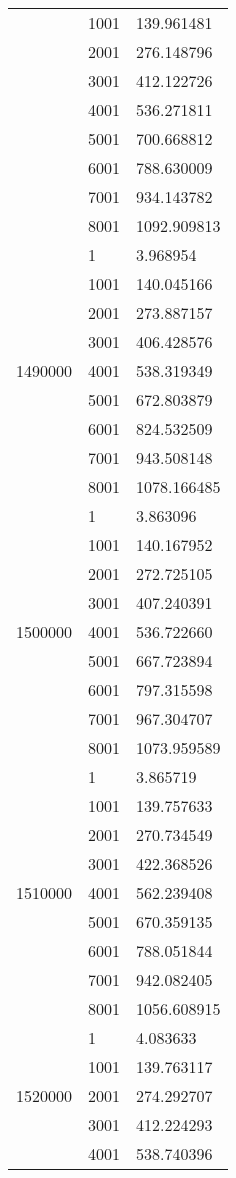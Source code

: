 \begin{table}[htb!]
\begin{tabular}{lll}
 & 1001 & 139.961481 \\
 & 2001 & 276.148796 \\
 & 3001 & 412.122726 \\
 & 4001 & 536.271811 \\
 & 5001 & 700.668812 \\
 & 6001 & 788.630009 \\
 & 7001 & 934.143782 \\
 & 8001 & 1092.909813 \\
\multirow[c]{9}{*}{1490000} & 1 & 3.968954 \\
 & 1001 & 140.045166 \\
 & 2001 & 273.887157 \\
 & 3001 & 406.428576 \\
 & 4001 & 538.319349 \\
 & 5001 & 672.803879 \\
 & 6001 & 824.532509 \\
 & 7001 & 943.508148 \\
 & 8001 & 1078.166485 \\
\multirow[c]{9}{*}{1500000} & 1 & 3.863096 \\
 & 1001 & 140.167952 \\
 & 2001 & 272.725105 \\
 & 3001 & 407.240391 \\
 & 4001 & 536.722660 \\
 & 5001 & 667.723894 \\
 & 6001 & 797.315598 \\
 & 7001 & 967.304707 \\
 & 8001 & 1073.959589 \\
\multirow[c]{9}{*}{1510000} & 1 & 3.865719 \\
 & 1001 & 139.757633 \\
 & 2001 & 270.734549 \\
 & 3001 & 422.368526 \\
 & 4001 & 562.239408 \\
 & 5001 & 670.359135 \\
 & 6001 & 788.051844 \\
 & 7001 & 942.082405 \\
 & 8001 & 1056.608915 \\
\multirow[c]{9}{*}{1520000} & 1 & 4.083633 \\
 & 1001 & 139.763117 \\
 & 2001 & 274.292707 \\
 & 3001 & 412.224293 \\
 & 4001 & 538.740396 \\

\end{tabular}
\end{table}
